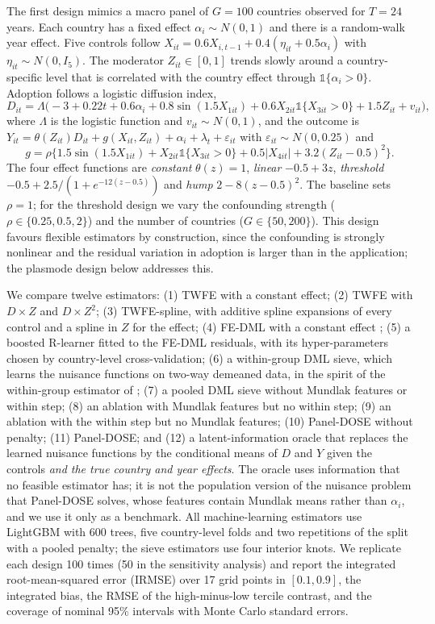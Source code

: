 \documentclass[pdflatex,sn-basic]{sn-jnl}%
\theoremstyle{thmstyleone}
\theoremstyle{thmstyletwo}
\begin{document}
The first design mimics a macro panel of $G=100$ countries observed for $T=24$ years. Each country has a fixed effect $\alpha_i\sim N(0,1)$ and there is a random-walk year effect. Five controls follow $X_{it}=0.6X_{i,t-1}+0.4(\eta_{it}+0.5\alpha_i)$ with $\eta_{it}\sim N(0,I_5)$. The moderator $Z_{it}\in[0,1]$ trends slowly around a country-specific level that is correlated with the country effect through $\mathbb{1}\{\alpha_i>0\}$. Adoption follows a logistic diffusion index,
\[
D_{it}=\Lambda\big(-3+0.22t+0.6\alpha_i+0.8\sin(1.5X_{1it})+0.6X_{2it}\mathbb{1}\{X_{3it}>0\}+1.5Z_{it}+v_{it}\big),
\]
where $\Lambda$ is the logistic function and $v_{it}\sim N(0,1)$, and the outcome is $Y_{it}=\theta(Z_{it})D_{it}+g(X_{it},Z_{it})+\alpha_i+\lambda_t+\varepsilon_{it}$ with $\varepsilon_{it}\sim N(0,0.25)$ and
\[
g=\rho\big\{1.5\sin(1.5X_{1it})+X_{2it}\mathbb{1}\{X_{3it}>0\}+0.5|X_{4it}|+3.2(Z_{it}-0.5)^2\big\}.
\]
The four effect functions are \emph{constant} $\theta(z)=1$, \emph{linear} $-0.5+3z$, \emph{threshold} $-0.5+2.5/(1+e^{-12(z-0.5)})$ and \emph{hump} $2-8(z-0.5)^2$. The baseline sets $\rho=1$; for the threshold design we vary the confounding strength ($\rho\in\{0.25,0.5,2\}$) and the number of countries ($G\in\{50,200\}$). This design favours flexible estimators by construction, since the confounding is strongly nonlinear and the residual variation in adoption is larger than in the application; the plasmode design below addresses this.

We compare twelve estimators: (1) TWFE with a constant effect; (2) TWFE with $D\times Z$ and $D\times Z^2$; (3) TWFE-spline, with additive spline expansions of every control and a spline in $Z$ for the effect; (4) FE-DML with a constant effect \citep{clarke2023panel}; (5) a boosted R-learner \citep{nie2021quasi} fitted to the FE-DML residuals, with its hyper-parameters chosen by country-level cross-validation; (6) a within-group DML sieve, which learns the nuisance functions on two-way demeaned data, in the spirit of the within-group estimator of \citet{clarke2023panel}; (7) a pooled DML sieve without Mundlak features or within step; (8) an ablation with Mundlak features but no within step; (9) an ablation with the within step but no Mundlak features; (10) Panel-DOSE without penalty; (11) Panel-DOSE; and (12) a latent-information oracle that replaces the learned nuisance functions by the conditional means of $D$ and $Y$ given the controls \emph{and the true country and year effects}. The oracle uses information that no feasible estimator has; it is not the population version of the nuisance problem that Panel-DOSE solves, whose features contain Mundlak means rather than $\alpha_i$, and we use it only as a benchmark. All machine-learning estimators use LightGBM \citep{ke2017lightgbm} with 600 trees, five country-level folds and two repetitions of the split with a pooled penalty; the sieve estimators use four interior knots. We replicate each design 100 times (50 in the sensitivity analysis) and report the integrated root-mean-squared error (IRMSE) over 17 grid points in $[0.1,0.9]$, the integrated bias, the RMSE of the high-minus-low tercile contrast, and the coverage of nominal 95\% intervals with Monte Carlo standard errors.
\end{document}
